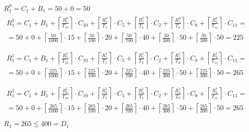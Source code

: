 \begin{gather*}
  R_{1}^0 = C_{1} + B_{1} = 50 + 0 = 50 \\
  \begin{multlined}
    R_1^1 = C_1 + B_1 + \left\lceil\frac{R_1^0}{T_{10}}\right\rceil\cdot C_{10} + %
    \left\lceil\frac{R_1^0}{T_5}\right\rceil\cdot C_5 + %
    \left\lceil\frac{R_1^0}{T_2}\right\rceil\cdot C_2 + %
    \left\lceil\frac{R_1^0}{T_8}\right\rceil\cdot C_8 + %
    \left\lceil\frac{R_1^0}{T_{11}}\right\rceil\cdot C_{11} = \\%
    = 50 + 0 + \left\lceil\frac{50}{1000}\right\rceil\cdot 15 + %
    \left\lceil\frac{50}{100}\right\rceil\cdot 20 + %
    \left\lceil\frac{50}{700}\right\rceil\cdot 40 + %
    \left\lceil\frac{50}{300}\right\rceil\cdot 50 + %
    \left\lceil\frac{50}{300}\right\rceil\cdot 50 = 225 \\
  \end{multlined} \\
  \begin{multlined}
    R_1^1 = C_1 + B_1 + \left\lceil\frac{R_1^1}{T_{10}}\right\rceil\cdot C_{10} + %
    \left\lceil\frac{R_1^1}{T_5}\right\rceil\cdot C_5 + %
    \left\lceil\frac{R_1^1}{T_2}\right\rceil\cdot C_2 + %
    \left\lceil\frac{R_1^1}{T_8}\right\rceil\cdot C_8 + %
    \left\lceil\frac{R_1^1}{T_{11}}\right\rceil\cdot C_{11} = \\%
    = 50 + 0 + \left\lceil\frac{225}{1000}\right\rceil\cdot 15 + %
    \left\lceil\frac{225}{100}\right\rceil\cdot 20 + %
    \left\lceil\frac{225}{700}\right\rceil\cdot 40 + %
    \left\lceil\frac{225}{300}\right\rceil\cdot 50 + %
    \left\lceil\frac{225}{300}\right\rceil\cdot 50 = 265 \\
  \end{multlined} \\
  \begin{multlined}
    R_1^1 = C_1 + B_1 + \left\lceil\frac{R_1^1}{T_{10}}\right\rceil\cdot C_{10} + %
    \left\lceil\frac{R_1^1}{T_5}\right\rceil\cdot C_5 + %
    \left\lceil\frac{R_1^1}{T_2}\right\rceil\cdot C_2 + %
    \left\lceil\frac{R_1^1}{T_8}\right\rceil\cdot C_8 + %
    \left\lceil\frac{R_1^1}{T_{11}}\right\rceil\cdot C_{11} = \\%
    = 50 + 0 + \left\lceil\frac{265}{1000}\right\rceil\cdot 15 + %
    \left\lceil\frac{265}{100}\right\rceil\cdot 20 + %
    \left\lceil\frac{265}{700}\right\rceil\cdot 40 + %
    \left\lceil\frac{265}{300}\right\rceil\cdot 50 + %
    \left\lceil\frac{265}{300}\right\rceil\cdot 50 = 265 \\
  \end{multlined} \\
  R_1 = 265 \le 400 = D_1
\end{gather*}

